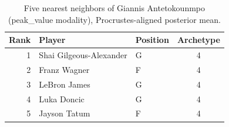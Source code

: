 \begin{table}[htbp]
  \centering\small
  \begin{tabular}{rllc}
    \toprule
    Rank & Player & Position & Archetype \\
    \midrule
    1 & Shai Gilgeous-Alexander & G & 4 \\
    2 & Franz Wagner & F & 4 \\
    3 & LeBron James & G & 4 \\
    4 & Luka Doncic & G & 4 \\
    5 & Jayson Tatum & F & 4 \\
    \bottomrule
  \end{tabular}
  \caption{Five nearest neighbors of Giannis Antetokounmpo (peak_value modality), Procrustes-aligned posterior mean.}
  \label{tab:Giannis_Antetokounmpo_neighbors_peak_value}
\end{table}

